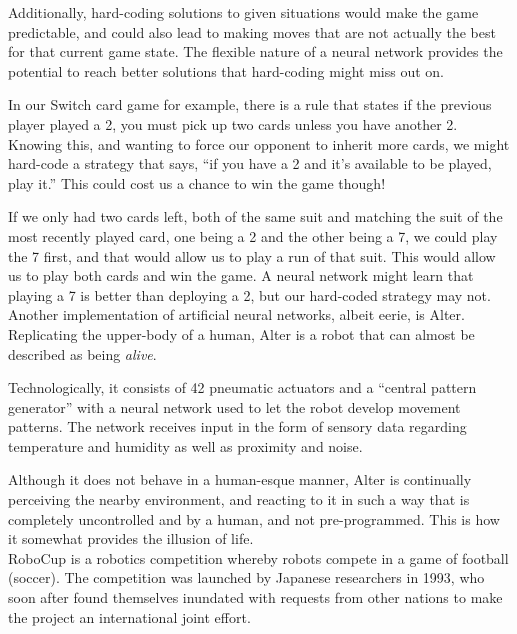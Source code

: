 \documentclass[12pt,a4paper]{article}
\begin{document}
Additionally, hard-coding solutions to given situations would make the game predictable, and could also lead to making moves that are not actually the best for that current game state. The flexible nature of a neural network provides the potential to reach better solutions that hard-coding might miss out on. 

In our Switch card game for example, there is a rule that states if the previous player played a 2, you must pick up two cards unless you have another 2. Knowing this, and wanting to force our opponent to inherit more cards, we might hard-code a strategy that says, \enquote{if you have a 2 and it's available to be played, play it.} This could cost us a chance to win the game though! 

If we only had two cards left, both of the same suit and matching the suit of the most recently played card, one being a 2 and the other being a 7, we could play the 7 first, and that would allow us to play a run of that suit. This would allow us to play both cards and win the game. A neural network might learn that playing a 7 is better than deploying a 2, but our hard-coded strategy may not.\\


Another implementation of artificial neural networks, albeit eerie, is Alter\citep{21}. Replicating the upper-body of a human, Alter is a robot that can almost be described as being \textit{alive}. 

Technologically, it consists of 42 pneumatic actuators and a \enquote{central pattern generator} with a neural network used to let the robot develop movement patterns\citep{21}. The network receives input in the form of sensory data regarding temperature and humidity as well as proximity and noise\citep{22}. 

Although it does not behave in a human-esque manner, Alter is continually perceiving the nearby environment, and reacting to it in such a way that is completely uncontrolled and by a human, and not pre-programmed. This is how it somewhat provides the illusion of life. \\


RoboCup\citep{23} is a robotics competition whereby robots compete in a game of football (soccer). The competition was launched by Japanese researchers in 1993, who soon after found themselves inundated with requests from other nations to make the project an international joint effort\citep{23}. 
\end{document}
